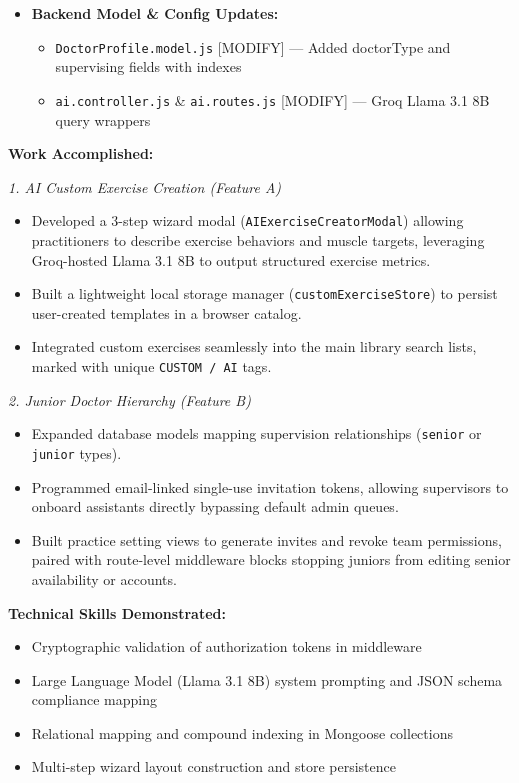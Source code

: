 \documentclass[11pt,a4paper]{article}
\begin{document}
\begin{itemize}
{\begin{itemize}
\begin{itemize}
      \item \texttt{juniorGuard.middleware.js} [NEW] --- Access controls restricting junior configuration writes
    \end{itemize}
  \item \textbf{Backend Model \& Config Updates:}
    \begin{itemize}
      \item \texttt{DoctorProfile.model.js} [MODIFY] --- Added doctorType and supervising fields with indexes
      \item \texttt{ai.controller.js} \& \texttt{ai.routes.js} [MODIFY] --- Groq Llama 3.1 8B query wrappers
    \end{itemize}
\end{itemize}

\textbf{Work Accomplished:}

\textit{1. AI Custom Exercise Creation (Feature A)}
\begin{itemize}
  \item Developed a 3-step wizard modal (\texttt{AIExerciseCreatorModal}) allowing practitioners to describe exercise behaviors and muscle targets, leveraging Groq-hosted Llama 3.1 8B to output structured exercise metrics.
  \item Built a lightweight local storage manager (\texttt{customExerciseStore}) to persist user-created templates in a browser catalog.
  \item Integrated custom exercises seamlessly into the main library search lists, marked with unique \texttt{CUSTOM / AI} tags.
\end{itemize}

\textit{2. Junior Doctor Hierarchy (Feature B)}
\begin{itemize}
  \item Expanded database models mapping supervision relationships (\texttt{senior} or \texttt{junior} types).
  \item Programmed email-linked single-use invitation tokens, allowing supervisors to onboard assistants directly bypassing default admin queues.
  \item Built practice setting views to generate invites and revoke team permissions, paired with route-level middleware blocks stopping juniors from editing senior availability or accounts.
\end{itemize}

\textbf{Technical Skills Demonstrated:}
\begin{itemize}
  \item Cryptographic validation of authorization tokens in middleware
  \item Large Language Model (Llama 3.1 8B) system prompting and JSON schema compliance mapping
  \item Relational mapping and compound indexing in Mongoose collections
  \item Multi-step wizard layout construction and store persistence
\end{itemize}

}
\end{itemize}
\end{document}

